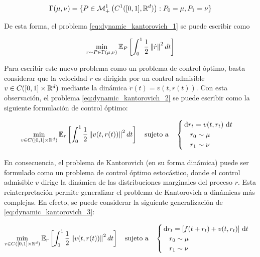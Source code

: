 \begin{equation*}
	\Gamma(\mu,\nu) = \{P\in \mathcal{M}_+^1\left(C^1([0,1],\mathbb{R}^d)\right): P_0=\mu, P_1 = \nu\}
\end{equation*}

De esta forma, el problema \eqref{eq:dynamic_kantorovich_1} se puede escribir como

\begin{equation}
	\label{eq:dynamic_kantorovich_2}
	\min_{r\sim P\in \Gamma(\mu,\nu)} \mathbb{E}_{P}\left[\int_0^1 \frac{1}{2} \left\lVert \dot{r} \right\rVert^2 dt\right]
\end{equation}

Para escribir este nuevo problema como un problema de control óptimo, basta considerar que la velocidad $\dot{r}$ es dirigida por un control admisible $v\in C([0,1]\times\mathbb{R}^d)$ mediante la dinámica $\dot r(t)=v(t,r(t))$. Con esta observación, el problema \eqref{eq:dynamic_kantorovich_2} se puede escribir como la siguiente formulación de control óptimo:

\begin{equation}
	\label{eq:dynamic_kantorovich_3}
	\min_{v\in C([0,1]\times\mathbb{R}^d)} \mathbb{E}_{r}\left[\int_0^1 \frac{1}{2} \left\lVert v(t,r(t)) \right\rVert^2 dt\right]
	\quad \text{sujeto a} \quad
	\begin{cases}
		\,\operatorname{d}\! r_t = v(t,r_t)\,\operatorname{d}\! t\\
		\quad r_0\sim\mu\\
		\quad r_1\sim\nu
	\end{cases}
\end{equation}

En consecuencia, el problema de Kantorovich (en su forma dinámica) puede ser formulado como un problema de control óptimo estocástico, donde el control admisible $v$ dirige la dinámica de las distribuciones marginales del proceso $r$. Esta reinterpretación permite generalizar el problema de Kantorovich a dinámicas más complejas. En efecto, se puede considerar la siguiente generalización de \eqref{eq:dynamic_kantorovich_3}:

\begin{equation}
	\label{eq:dynamic_kantorovich_4}
	\min_{v\in C([0,1]\times\mathbb{R}^d)} \mathbb{E}_{r}\left[\int_0^1 \frac{1}{2} \left\lVert v(t,r(t)) \right\rVert^2 dt\right]
	\quad \text{sujeto a} \quad
	\begin{cases}
		\,\operatorname{d}\! r_t = \left[f(t+r_t) + v(t,r_t)\right]\,\operatorname{d}\! t\\
		\quad r_0\sim\mu\\
		\quad r_1\sim\nu
	\end{cases}
\end{equation}

